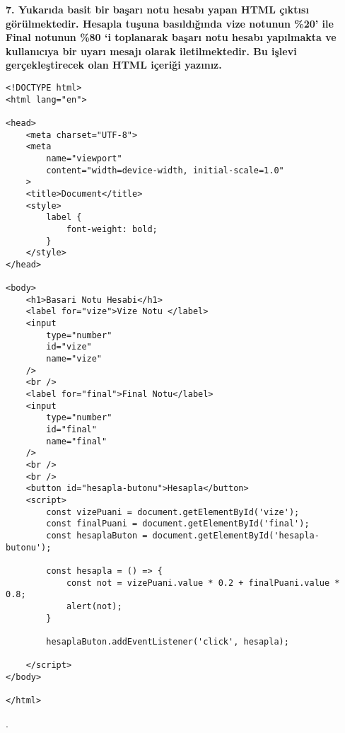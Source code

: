 \documentclass[a4paper,10pt]{article}
\begin{document}
\pagebreak

\textbf{7. Yukarıda basit bir başarı notu hesabı yapan HTML çıktısı görülmektedir.
Hesapla tuşuna basıldığında vize notunun \%20’ ile Final notunun \%80 ‘i toplanarak başarı notu hesabı yapılmakta ve kullanıcıya bir uyarı mesajı olarak iletilmektedir. Bu işlevi gerçekleştirecek olan HTML içeriği yazınız. }
    
\begin{lstlisting}
<!DOCTYPE html>
<html lang="en">

<head>
    <meta charset="UTF-8">
    <meta
        name="viewport"
        content="width=device-width, initial-scale=1.0"
    >
    <title>Document</title>
    <style>
        label {
            font-weight: bold;
        }
    </style>
</head>

<body>
    <h1>Basari Notu Hesabi</h1>
    <label for="vize">Vize Notu </label>
    <input
        type="number"
        id="vize"
        name="vize"
    />
    <br />
    <label for="final">Final Notu</label>
    <input
        type="number"
        id="final"
        name="final"
    />
    <br />
    <br />
    <button id="hesapla-butonu">Hesapla</button>
    <script>
        const vizePuani = document.getElementById('vize');
        const finalPuani = document.getElementById('final');
        const hesaplaButon = document.getElementById('hesapla-butonu');

        const hesapla = () => {
            const not = vizePuani.value * 0.2 + finalPuani.value * 0.8;
            alert(not);
        }

        hesaplaButon.addEventListener('click', hesapla);

    </script>
</body>

</html>
\end{lstlisting}.\\
\end{document}
